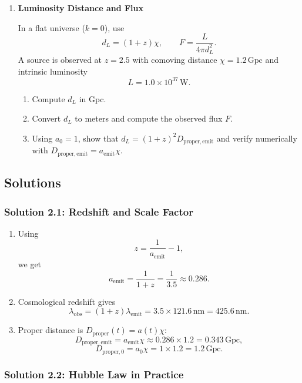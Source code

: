\begin{enumerate}[label=2.\arabic*]
  \item \label{q:2.4} \textbf{Luminosity Distance and Flux}

  In a flat universe ($k=0$), use
  \[
    d_L=(1+z)\chi,
    \qquad
    F=\frac{L}{4\pi d_L^2}.
  \]
  A source is observed at $z=2.5$ with comoving distance $\chi=1.2\,\mathrm{Gpc}$ and intrinsic luminosity
  \[
    L=1.0\times 10^{37}\,\mathrm{W}.
  \]
  \begin{enumerate}[label=(\alph*)]
    \item Compute $d_L$ in Gpc.
    \item Convert $d_L$ to meters and compute the observed flux $F$.
    \item Using $a_0=1$, show that $d_L=(1+z)^2D_{\mathrm{proper,emit}}$ and verify numerically with $D_{\mathrm{proper,emit}}=a_{\mathrm{emit}}\chi$.
  \end{enumerate}
\end{enumerate}

\bigskip
\bigskip
\bigskip

\subsection{Solutions}

\subsubsection*{Solution 2.1: Redshift and Scale Factor}

\begin{enumerate}[label=(\alph*)]
  \item Using
  \[
    z = \frac{1}{a_{\mathrm{emit}}}-1,
  \]
  we get
  \[
    a_{\mathrm{emit}} = \frac{1}{1+z} = \frac{1}{3.5} \approx 0.286.
  \]

  \item Cosmological redshift gives
  \[
    \lambda_{\mathrm{obs}} = (1+z)\lambda_{\mathrm{emit}} = 3.5\times 121.6\,\mathrm{nm}
    = 425.6\,\mathrm{nm}.
  \]

  \item Proper distance is $D_{\mathrm{proper}}(t)=a(t)\chi$:
  \[
    D_{\mathrm{proper,emit}} = a_{\mathrm{emit}}\chi \approx 0.286\times 1.2 = 0.343\,\mathrm{Gpc},
  \]
  \[
    D_{\mathrm{proper,0}} = a_0 \chi = 1\times 1.2 = 1.2\,\mathrm{Gpc}.
  \]
\end{enumerate}

\subsubsection*{Solution 2.2: Hubble Law in Practice}

